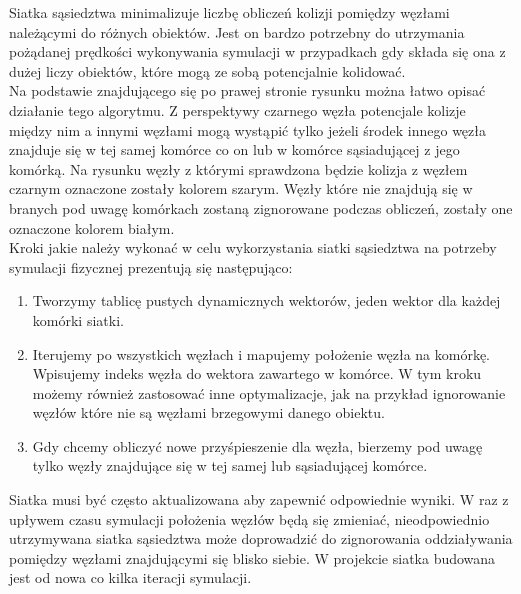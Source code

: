 \documentclass[12pt, letterpaper]{report}
\begin{document}
    Siatka sąsiedztwa minimalizuje liczbę obliczeń kolizji pomiędzy węzłami 
    należącymi do różnych obiektów. Jest on bardzo potrzebny do utrzymania 
    pożądanej prędkości wykonywania symulacji w przypadkach gdy składa się ona 
    z dużej liczy obiektów, które mogą ze sobą potencjalnie kolidować. \\
    
    Na podstawie znajdującego się po prawej stronie rysunku można łatwo opisać
    działanie tego algorytmu. Z perspektywy czarnego węzła
    potencjale kolizje między nim a innymi węzłami mogą wystąpić tylko 
    jeżeli środek innego węzła znajduje się w tej 
    samej komórce co on lub w komórce sąsiadującej z jego komórką. Na rysunku 
    węzły z którymi sprawdzona będzie kolizja z węzłem czarnym oznaczone zostały
    kolorem szarym. Węzły które nie znajdują się w branych pod uwagę komórkach 
    zostaną zignorowane podczas obliczeń, zostały one oznaczone kolorem białym. \\

    Kroki jakie należy wykonać w celu wykorzystania siatki sąsiedztwa na 
    potrzeby symulacji fizycznej prezentują się następująco:
    \begin{enumerate}
        \item Tworzymy tablicę pustych dynamicznych wektorów, jeden wektor dla każdej komórki siatki.

        \item Iterujemy po wszystkich węzłach i mapujemy położenie węzła na komórkę. Wpisujemy indeks węzła 
        do wektora zawartego w komórce. W tym kroku możemy również zastosować inne optymalizacje, jak na przykład 
        ignorowanie węzłów które nie są węzłami brzegowymi danego obiektu.

        \item Gdy chcemy obliczyć nowe przyśpieszenie dla węzła, bierzemy pod uwagę tylko węzły znajdujące 
        się w tej samej lub sąsiadującej komórce.
    \end{enumerate}

    Siatka musi być często aktualizowana aby zapewnić odpowiednie wyniki. W raz z upływem czasu symulacji położenia
    węzłów będą się zmieniać, nieodpowiednio utrzymywana siatka sąsiedztwa może doprowadzić do zignorowania 
    oddziaływania pomiędzy węzłami znajdującymi się blisko siebie. W projekcie siatka budowana jest od nowa 
    co kilka iteracji symulacji.
\end{document}
